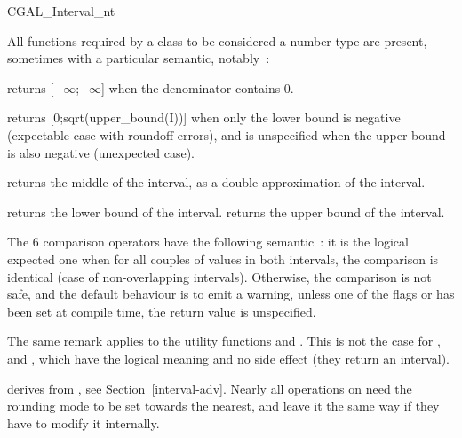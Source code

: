 \begin{ccClass} {CGAL_Interval_nt}
\ccOperations
{}

All functions required by a class to be considered a {\cgal} number type are
present, sometimes with a particular semantic, notably~:


 {returns
[$-\infty$;$+\infty$] when the denominator contains 0.}

 {returns
[0;sqrt(upper\_bound(I))] when only the lower bound is negative (expectable
case with roundoff errors), and is unspecified when the upper bound is also
negative (unexpected case).}

 {returns the
middle of the interval, as a double approximation of the interval.}

 {returns the lower bound of the interval.}
 {returns the upper bound of the interval.}

The 6 comparison operators have the following semantic~: it is the logical
expected one when for all couples of values in both intervals, the comparison
is identical (case of non-overlapping intervals).  Otherwise, the comparison
is not safe, and the default behaviour is to emit a warning, unless one of the
flags  or  has been set at
compile time, the return value is unspecified.

The same remark applies to the utility functions  and
.  This is not the case for ,
 and , which have the logical meaning and no
side effect (they return an interval).

\ccImplementation

 derives from , 
see Section~\ref{interval-adv}.  Nearly all operations on
 need the rounding mode to be set towards the nearest,
and leave it the same way if they have to modify it internally.


\end{ccClass}
